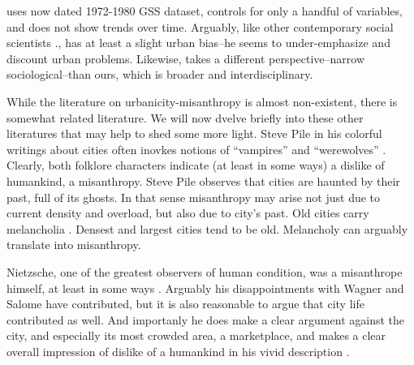 \documentclass[10pt, letterpaper]{article}
\begin{document}
\begin{spacing}{1.4}
\citet{wilson85} uses now dated 1972-1980 GSS dataset, controls for only a
handful of variables, and does not show trends over time.  Arguably, like other
contemporary social scientists \citet[e.g.,][]{veenhoven94,meyer13,fischer82}., \citeauthor{wilson85} has at
least a slight urban bias--he seems to under-emphasize and discount urban
problems. Likewise, \citet{wilson85} takes a different perspective--narrow
sociological--than ours, which is broader and interdisciplinary.

While the literature on urbanicity-misanthropy is almost non-existent, there is
somewhat related literature.%
 We will now dvelve briefly into these other literatures that may help to shed some more light.
Steve Pile in his colorful writings about cities often inovkes notions of ``vampires'' and ``werewolves''
\cite{pile05,pile05B,pile99}. Clearly, both folklore characters indicate (at
least in some ways) a dislike of humankind,  a misanthropy. Steve Pile observes that cities are haunted by their past, full of its ghosts. In that sense misanthropy may arise not just due to current density and overload, but also due to city's past. %
Old cities carry melancholia \citep{pile05B}. Densest and largest cities
tend to be old. Melancholy can arguably translate into misanthropy. %

Nietzsche, one of the greatest observers of human condition, was a misanthrope himself,
at least in some ways \citep[e.g.,][]{avramenko2004zarathustra}.
Arguably his disappointments with Wagner and Salome have contributed, but it is
also reasonable to argue that city life contributed as well. And importanly he
does make a clear argument against the city, and especially its most crowded
area, a marketplace, and makes a clear overall impression of dislike of a
humankind in his vivid description \citep[e.g.,``The Flies in the Market-Place''][]{nietzsche05}.


\end{spacing}
\end{document}
